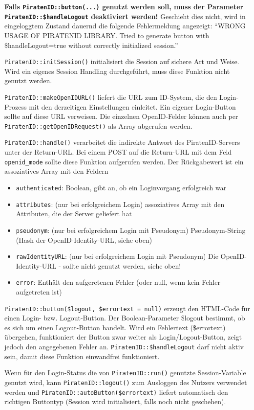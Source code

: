 \textbf{Falls \texttt{PiratenID::button(...)} genutzt werden soll, muss der Parameter \texttt{PiratenID::\$handleLogout} deaktiviert werden!}
Geschieht dies nicht, wird in eingeloggtem Zustand dauernd die folgende Fehlermeldung angezeigt:
"`WRONG USAGE OF PIRATENID LIBRARY. Tried to generate button with \$handleLogout=true without correctly initialized session."'

\texttt{PiratenID::initSession()} initialisiert die Session auf sichere Art und Weise.
Wird ein eigenes Session Handling durchgeführt, muss diese Funktion nicht genutzt werden.

\texttt{PiratenID::makeOpenIDURL()} liefert die URL zum ID-System, die den Login-Prozess mit den derzeitigen Einstellungen einleitet.
Ein eigener Login-Button sollte auf diese URL verweisen.
Die einzelnen OpenID-Felder können auch per \texttt{PiratenID::getOpenIDRequest()} als Array abgerufen werden.

\texttt{PiratenID::handle()} verarbeitet die indirekte Antwort des PiratenID-Servers unter der Return-URL.
Bei einem POST auf die Return-URL mit dem Feld \texttt{openid\_mode} sollte diese Funktion aufgerufen werden.
Der Rückgabewert ist ein assoziatives Array mit den Feldern 
\begin{itemize}
	\item \texttt{authenticated}: Boolean, gibt an, ob ein Loginvorgang erfolgreich war
	\item \texttt{attributes}: (nur bei erfolgreichem Login) assoziatives Array mit den Attributen, die der Server geliefert hat
	\item \texttt{pseudonym}: (nur bei erfolgreichem Login mit Pseudonym) Pseudonym-String (Hash der OpenID-Identity-URL, siehe oben)
	\item \texttt{rawIdentityURL}: (nur bei erfolgreichem Login mit Pseudonym) Die OpenID-Identity-URL - sollte nicht genutzt werden, siehe oben!
	\item \texttt{error}: Enthält den aufgeretenen Fehler (oder null, wenn kein Fehler aufgetreten ist)
\end{itemize}

\texttt{PiratenID::button(\$logout, \$errortext = null)} erzeugt den HTML-Code für einen Login- bzw. Logout-Button.
Der Boolean-Parameter \$logout bestimmt, ob es sich um einen Logout-Button handelt.
Wird ein Fehlertext (\$errortext) übergehen, funktioniert der Button zwar weiter als Login/Logout-Button,
zeigt jedoch den angegebenen Fehler an.
\texttt{PiratenID::\$handleLogout} darf nicht aktiv sein, damit diese Funktion einwandfrei funktioniert.

Wenn für den Login-Status die von \texttt{PiratenID::run()} genutzte Session-Variable genutzt wird,
kann \texttt{PiratenID::logout()} zum Ausloggen des Nutzers verwendet werden und
\texttt{PiratenID::autoButton(\$errortext)} liefert automatisch den richtigen Buttontyp
(Session wird initialisiert, falls noch nicht geschehen).
